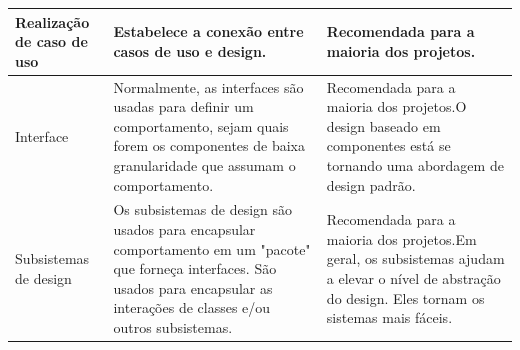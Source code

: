 \begin{longtable}{||p{3cm}|p{5cm}|p{5cm}||}
Realização de caso de uso                          & Estabelece a conexão entre casos de uso e design.                                                                                                                                                                                                                                                                                                                                                                 & Recomendada para a maioria dos projetos.                                                                                                                                                                                                                                                                                                                                         \\ \hline
Interface                                          & Normalmente, as interfaces são usadas para definir um comportamento, sejam quais forem os componentes de baixa granularidade que assumam o comportamento.                                                                                                                                                                                                                                                         & Recomendada para a maioria dos projetos.O design baseado em componentes está se tornando uma abordagem de design padrão.                                                                                                                                                                                                                                                         \\ \hline
Subsistemas de design                              & Os subsistemas de design são usados para encapsular comportamento em um "pacote" que forneça interfaces. São usados para encapsular as interações de classes e/ou outros subsistemas.                                                                                                                                                                                                                             & Recomendada para a maioria dos projetos.Em geral, os subsistemas ajudam a elevar o nível de abstração do design. Eles tornam os sistemas mais fáceis.                                                                                                                                                                                                                            \\ \hline

\end{longtable}

